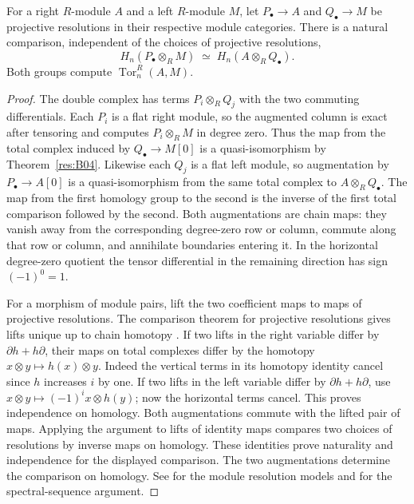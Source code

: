 \begin{theorem}
\label{res:B05}
For a right \(R\)-module \(A\) and a left \(R\)-module \(M\), let
\(P_\bullet\to A\) and \(Q_\bullet\to M\) be projective resolutions in
their respective module categories. There is a natural comparison,
independent of the choices of projective resolutions,
\[
        H_n(P_\bullet\otimes_R M)
        \;\simeq\; H_n(A\otimes_R Q_\bullet).
\]
Both groups compute \(\operatorname{Tor}_n^R(A,M)\).
\end{theorem}

\begin{proof}
The double complex has terms \(P_i\otimes_R Q_j\) with the two commuting
differentials. Each \(P_i\) is a flat right module, so the augmented
column is exact after tensoring and computes \(P_i\otimes_R M\) in
degree zero. Thus the map from the total complex induced by
\(Q_\bullet\to M[0]\) is a quasi-isomorphism by
Theorem~\ref{res:B04}. Likewise each \(Q_j\) is a flat left module, so
augmentation by \(P_\bullet\to A[0]\) is a quasi-isomorphism from the
same total complex to \(A\otimes_R Q_\bullet\). The map from the first
homology group to the second is the inverse of the first total
comparison followed by the second. Both augmentations are chain maps:
they vanish away from the corresponding degree-zero row or column,
commute along that row or column, and annihilate boundaries entering
it. In the horizontal degree-zero quotient the tensor differential in
the remaining direction has sign \((-1)^0=1\).

For a morphism of module pairs, lift the two coefficient maps to maps
of projective resolutions. The comparison theorem for projective
resolutions gives lifts unique up to chain homotopy
\cite[Chapter 10]{p103}. If two lifts in the right variable differ
by \(\partial h+h\partial\), their maps on total complexes differ by
the homotopy \(x\otimes y\mapsto h(x)\otimes y\). Indeed the vertical
terms in its homotopy identity cancel since \(h\) increases \(i\) by one.
If two lifts in the left variable differ by
\(\partial h+h\partial\), use
\(x\otimes y\mapsto(-1)^i x\otimes h(y)\);
now the horizontal terms cancel. This proves independence on
homology. Both augmentations commute with the lifted pair of maps.
Applying the argument to lifts of identity maps compares two choices
of resolutions by inverse maps on homology. These identities prove
naturality and independence for the displayed comparison. The two
augmentations determine the comparison on homology. See
\cite[Chapter 11]{p103} for the module resolution models and
\cite[Application 5.6.3]{weibel} for the spectral-sequence argument.
\end{proof}

